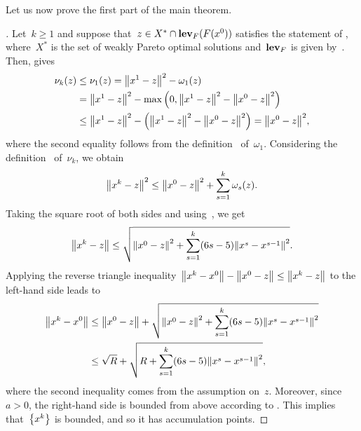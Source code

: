\documentclass[../main]{subfiles}
\begin{document}
Let us now prove the first part of the main theorem.
\begin{proof}[]
    Let~$k \ge 1$ and suppose that~$z \in X^\ast \cap \level_F(F(x^0))$ satisfies the statement of , where~$X^\ast$ is the set of weakly Pareto optimal solutions and~$\level_F$ is given by~.
    Then,  gives
    \begin{equation}
        \begin{split}
            \nu_k(z) &\le \nu_1(z) = \norm*{x^1 - z}^2 - \omega_1(z) \\
                           &= \norm*{x^1 - z}^2 - \max \left( 0, \norm*{x^1 - z}^2 - \norm*{x^0 - z}^2 \right) \\
                           &\le \norm*{x^1 - z}^2 - \left( \norm*{x^1 - z}^2 - \norm*{x^0 - z}^2 \right) = \norm*{x^0 - z}^2
        ,\end{split}
    \end{equation} 
    where the second equality follows from the definition~ of~$\omega_1$.
    Considering the definition~ of~$\nu_k$, we obtain
    \begin{equation}
        \norm*{x^k - z}^2 \le \norm*{x^0 - z}^2 + \sum_{s = 1}^{k} \omega_s(z)
    .\end{equation} 
    Taking the square root of both sides and using~, we get
    \begin{equation}
        \norm*{x^k - z} \le \sqrt{ \norm*{x^0 - z}^2 + \sum_{s = 1}^{k} (6s - 5) \norm*{x^s - x^{s - 1}}^2 }
    .\end{equation} 
    Applying the reverse triangle inequality~$\norm*{x^k - x^0} - \norm*{x^0 - z} \le \norm*{x^k - z}$ to the left-hand side leads to
    \begin{align}
        \norm*{x^k - x^0} &\le \norm*{x^0 - z} + \sqrt{ \norm*{x^0 - z}^2 + \sum_{s = 1}^{k} (6s - 5) \norm*{x^s - x^{s - 1}}^2 } \\
                          &\le \sqrt{R} + \sqrt{R + \sum_{s = 1}^{k} (6s - 5) \norm*{x^s - x^{s - 1}}^2}
    ,\end{align}
    where the second inequality comes from the assumption on~$z$.
    Moreover, since~$a > 0$, the right-hand side is bounded from above according to .
    This implies that~$\set*{x^k}$ is bounded, and so it has accumulation points.
\end{proof}
\end{document}
